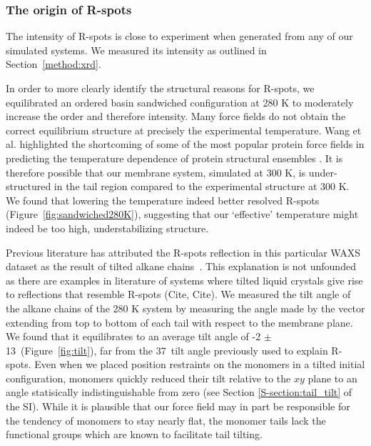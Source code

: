 \documentclass[journal=jpcbfk,manuscript=article]{achemso}
\begin{document}
  \subsubsection{The origin of R-spots}\label{section:rspots}
  
  The intensity of R-spots is close to experiment when generated from any of
  our simulated systems. We measured its intensity as outlined in Section~\ref{method:xrd}.

  In order to more clearly identify the structural reasons for R-spots, we
  equilibrated an ordered basin sandwiched configuration at 280 K to moderately
  increase the order and therefore intensity. Many force fields do not obtain
  the correct equilibrium structure at precisely the experimental temperature.
  Wang et al. highlighted the shortcoming of some of the most popular protein
  force fields in predicting the temperature dependence of protein structural
  ensembles \cite{wang_building_2017}. It is therefore possible that   %
  our membrane system, simulated at 300 K, is under-structured in the tail region
  compared to the experimental structure at 300 K. We found that lowering the
  temperature indeed better resolved R-spots (Figure~\ref{fig:sandwiched280K}),
  suggesting that our `effective' temperature might indeed be too high,
  understabilizing structure. 

  Previous literature has attributed the R-spots reflection in this particular
  WAXS dataset as the result of tilted alkane chains~\cite{feng_scalable_2014}.
  This explanation is not unfounded as there are examples in literature of
  systems where tilted liquid crystals give rise to reflections that resemble
  R-spots (Cite, Cite). We measured the tilt angle of the alkane chains of the
  280 K system by measuring the angle made by the vector extending from top to
  bottom of each tail with respect to the membrane plane. We found that it
  equilibrates to an average tilt angle of -2 $\pm$
  13\degree~(Figure~\ref{fig:tilt}), far from the 37\degree~tilt angle previously
  used to explain R-spots. Even when we placed position restraints on the
  monomers in a tilted initial configuration, monomers quickly reduced their tilt
  relative to the $xy$ plane to an angle statisically indistinguishable from zero
  (see Section \ref{S-section:tail_tilt} of the SI). While it is plausible that 
  our force field may in part be responsible for the tendency of monomers to stay
  nearly flat, the monomer tails lack the functional groups which are known to
  facilitate tail tilting.   
\end{document}
